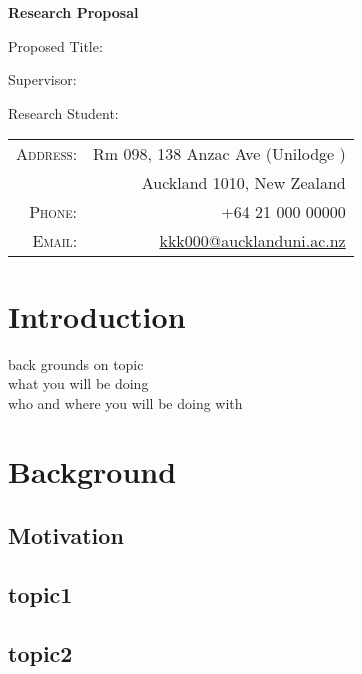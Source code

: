\documentclass[12pt, twoside]{article}
\begin{document}
  
	
\begin{center}\huge\bf{Research Proposal}
\end{center}

Proposed Title: 

Supervisor: 

Research Student: 

\begin{flushright}
\begin{tabular}{rr}
	
	\textsc{Address\hspace{0.1cm}\faHome:} 	  & Rm 098, 138 Anzac Ave (Unilodge    
	\href{https://www.google.com/maps/place/UniLodge/@-36.8490557,174.7741293,18.79z/data=!4m5!3m4!1s0x6d0d4807f139f155:0x20403cf649e18344!8m2!3d-36.8493347!4d174.773703}{\faMapMarker})\\& Auckland 1010, New Zealand \\
	\textsc{Phone\hspace{0.1cm}\faMobile:}    & +64 21 000 00000\\
	\textsc{Email\hspace{0.1cm}\faEnvelopeO:} & \href{mailto:jxue533@aucklanduni.ac.nz}{kkk000@aucklanduni.ac.nz}
\end{tabular}
\end{flushright}
\section{Introduction}
back grounds on topic \\
what you will be doing \\
who and where you will be doing with 
\section{Background}

\subsection{Motivation}
\subsection{topic1}
\subsection{topic2}
\end{document}

